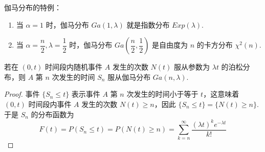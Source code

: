 伽马分布的特例：
\begin{enumerate}
    \item 当 $\alpha = 1$ 时，伽马分布 $Ga(1, \lambda)$ 就是指数分布 $Exp(\lambda)$.
    \item 当 $\alpha = \dfrac{n}{2}, \lambda = \dfrac{1}{2}$ 时，伽马分布 $Ga(\dfrac{n}{2}, \dfrac{1}{2})$ 是自由度为 $n$ 的卡方分布 $\chi^2(n)$.
\end{enumerate}

\begin{conclusion}[][泊松分布与伽马分布的关系]
    \indent 若在 $(0,t)$ 时间段内随机事件 $A$ 发生的次数 $N(t)$ 服从参数为 $\lambda t$ 的泊松分布，则 $A$ 第 $n$ 次发生的时间 $S_n$ 服从伽马分布 $Ga(n, \lambda)$.
\end{conclusion}

\begin{proof}
    事件 $\{ S_n \leqslant t \}$ 表示事件 $A$ 第 $n$ 次发生的时间小于等于 $t$，这意味着 $(0,t)$ 时间段内事件 $A$ 发生的次数 $N(t) \geqslant n$，因此 $\{ S_n \leqslant t \} = \{ N(t) \geqslant n \}$.于是 $S_n$ 的分布函数为
    $$
    F(t) = P(S_n \leqslant t) = P(N(t) \geqslant n) = \sum_{k=n}^{\infty} \dfrac{(\lambda t)^k e^{-\lambda t}}{k!}
    $$
\end{proof}






